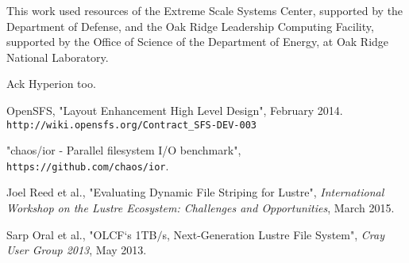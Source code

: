 \documentclass[conference,compsoc]{IEEEtran}
\begin{document}
This work used resources of the Extreme Scale Systems Center, supported
by the Department of Defense, and the Oak Ridge Leadership Computing
Facility, supported by the Office of Science of the Department of
Energy, at Oak Ridge National Laboratory.

Ack Hyperion too.



%
%
%
\begin{thebibliography}{1}

OpenSFS, "Layout Enhancement High Level Design", February 2014. \texttt{http://wiki.opensfs.org/Contract\_SFS-DEV-003}

"chaos/ior - Parallel filesystem I/O benchmark", \texttt{https://github.com/chaos/ior}.

Joel Reed et al., "Evaluating Dynamic File Striping for Lustre", \emph{International Workshop on the Lustre Ecosystem: Challenges and Opportunities}, March 2015.

Sarp Oral et al., "OLCF`s 1TB$/$s, Next-Generation Lustre File System", \emph{Cray User Group 2013}, May 2013.

\end{thebibliography}


\end{document}
